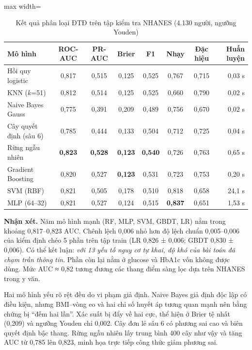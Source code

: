 \begin{table}[H]
\centering
\caption{Kết quả phân loại ĐTĐ trên tập kiểm tra NHANES (4.130 người, ngưỡng Youden)}
\label{tab:ch2-results}
\small
\begin{adjustbox}{max width=\linewidth}
\begin{tabular}{@{}lccccccr@{}}
\toprule
\textbf{Mô hình} & \textbf{ROC-AUC} & \textbf{PR-AUC} & \textbf{Brier} & \textbf{F1} & \textbf{Nhạy} & \textbf{Đặc hiệu} & \textbf{Huấn luyện} \\
\midrule
Hồi quy logistic & 0,817 & 0,515 & 0,125 & 0,525 & 0,767 & 0,715 & 0,03 s \\
KNN ($k$=51) & 0,812 & 0,514 & 0,125 & 0,525 & 0,660 & 0,790 & 0,02 s \\
Naive Bayes Gauss & 0,775 & 0,391 & 0,209 & 0,489 & 0,756 & 0,670 & 0,02 s \\
Cây quyết định (sâu 6) & 0,785 & 0,444 & 0,133 & 0,504 & 0,712 & 0,725 & 0,04 s \\
Rừng ngẫu nhiên & \textbf{0,823} & \textbf{0,528} & \textbf{0,123} & \textbf{0,540} & 0,726 & 0,763 & 0,65 s \\
Gradient Boosting & 0,820 & 0,527 & \textbf{0,123} & 0,531 & 0,723 & 0,753 & 0,20 s \\
SVM (RBF) & 0,821 & 0,505 & 0,178 & 0,510 & 0,818 & 0,658 & 24,1 s \\
MLP (64–32) & 0,821 & 0,527 & 0,124 & 0,515 & \textbf{0,837} & 0,651 & 1,53 s \\
\bottomrule
\end{tabular}
\end{adjustbox}
\end{table}


\textbf{Nhận xét.} Năm mô hình mạnh (RF, MLP, SVM, GBDT, LR) nằm trong khoảng 0,817–0,823 AUC. Chênh lệch 0,006 nhỏ hơn độ lệch chuẩn 0,005–0,006 của kiểm định chéo 5 phần trên tập train (LR 0,826 ± 0,006; GBDT 0,830 ± 0,006). Có thể kết luận: \emph{với 13 yếu tố nguy cơ tự khai, độ khó của bài toán đã chạm trần thông tin}. Phần còn lại nằm ở glucose và HbA1c vốn không được dùng. Mức AUC ≈ 0,82 tương đương các thang điểm sàng lọc dựa trên NHANES trong y văn.

Hai mô hình yếu rõ rệt đều do vi phạm giả định. Naive Bayes giả định độc lập có điều kiện, nhưng BMI–vòng eo và hai chỉ số huyết áp tương quan mạnh nên bằng chứng bị ``đếm hai lần''. Xác suất bị đẩy về hai cực, thể hiện ở Brier tệ nhất (0,209) và ngưỡng Youden chỉ 0,002. Cây đơn lẻ sâu 6 có phương sai cao và biên quyết định bậc thang. Rừng ngẫu nhiên lấy trung bình 400 cây như vậy và tăng AUC từ 0,785 lên 0,823, minh họa trực tiếp công thức giảm phương sai.

